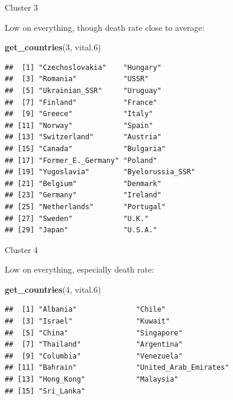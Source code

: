 \documentclass[ignorenonframetext,]{beamer}
\newenvironment{Shaded}{\begin{snugshade}}{\end{snugshade}}
\newcommand{\DecValTok}[1]{\textcolor[rgb]{0.00,0.00,0.81}{#1}}
\newcommand{\FloatTok}[1]{\textcolor[rgb]{0.00,0.00,0.81}{#1}}
\newcommand{\KeywordTok}[1]{\textcolor[rgb]{0.13,0.29,0.53}{\textbf{#1}}}
\newcommand{\NormalTok}[1]{#1}
\begin{document}
\begin{frame}[fragile]{Cluster 3}
\protect\hypertarget{cluster-3-1}{}

Low on everything, though death rate close to average:

\begin{Shaded}
\begin{Highlighting}[]
\KeywordTok{get_countries}\NormalTok{(}\DecValTok{3}\NormalTok{, vital}\FloatTok{.6}\NormalTok{)}
\end{Highlighting}
\end{Shaded}

\begin{verbatim}
##  [1] "Czechoslovakia"    "Hungary"          
##  [3] "Romania"           "USSR"             
##  [5] "Ukrainian_SSR"     "Uruguay"          
##  [7] "Finland"           "France"           
##  [9] "Greece"            "Italy"            
## [11] "Norway"            "Spain"            
## [13] "Switzerland"       "Austria"          
## [15] "Canada"            "Bulgaria"         
## [17] "Former_E._Germany" "Poland"           
## [19] "Yugoslavia"        "Byelorussia_SSR"  
## [21] "Belgium"           "Denmark"          
## [23] "Germany"           "Ireland"          
## [25] "Netherlands"       "Portugal"         
## [27] "Sweden"            "U.K."             
## [29] "Japan"             "U.S.A."
\end{verbatim}

\end{frame}

\begin{frame}[fragile]{Cluster 4}
\protect\hypertarget{cluster-4}{}

Low on everything, especially death rate:

\begin{Shaded}
\begin{Highlighting}[]
\KeywordTok{get_countries}\NormalTok{(}\DecValTok{4}\NormalTok{, vital}\FloatTok{.6}\NormalTok{)}
\end{Highlighting}
\end{Shaded}

\begin{verbatim}
##  [1] "Albania"              "Chile"               
##  [3] "Israel"               "Kuwait"              
##  [5] "China"                "Singapore"           
##  [7] "Thailand"             "Argentina"           
##  [9] "Columbia"             "Venezuela"           
## [11] "Bahrain"              "United_Arab_Emirates"
## [13] "Hong_Kong"            "Malaysia"            
## [15] "Sri_Lanka"
\end{verbatim}

\end{frame}
\end{document}
